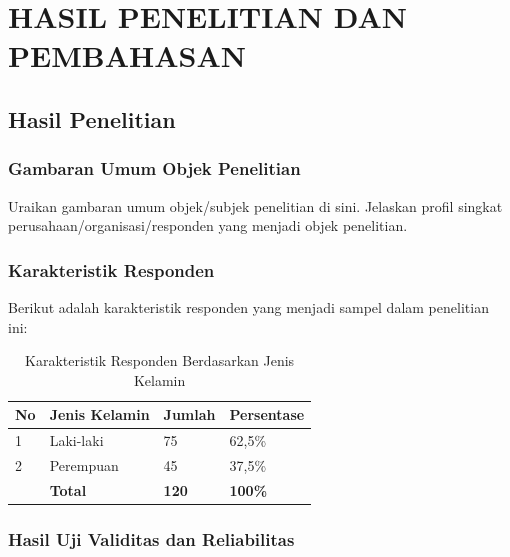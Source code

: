 
\chapter{HASIL PENELITIAN DAN PEMBAHASAN}
\label{bab:hasil}

\section{Hasil Penelitian}
\label{sec:hasil-penelitian}

\subsection{Gambaran Umum Objek Penelitian}
\label{subsec:gambaran-umum}

Uraikan gambaran umum objek/subjek penelitian di sini. Jelaskan profil singkat
perusahaan/organisasi/responden yang menjadi objek penelitian.

\subsection{Karakteristik Responden}
\label{subsec:karakteristik-responden}

Berikut adalah karakteristik responden yang menjadi sampel dalam penelitian ini:

\begin{table}[H]
\caption{Karakteristik Responden Berdasarkan Jenis Kelamin}
\label{tab:karakteristik-jenis-kelamin}
\begin{isitable}
\begin{tabular}{p{0.5cm} p{4cm} p{3cm} p{3cm}}
\toprule
\textbf{No} & \textbf{Jenis Kelamin} & \textbf{Jumlah} & \textbf{Persentase} \\
\midrule
1 & Laki-laki & 75 & 62,5\% \\
2 & Perempuan & 45 & 37,5\% \\
\midrule
& \textbf{Total} & \textbf{120} & \textbf{100\%} \\
\bottomrule
\end{tabular}
\end{isitable}
\end{table}

\subsection{Hasil Uji Validitas dan Reliabilitas}
\label{subsec:uji-valid-reliabel}

